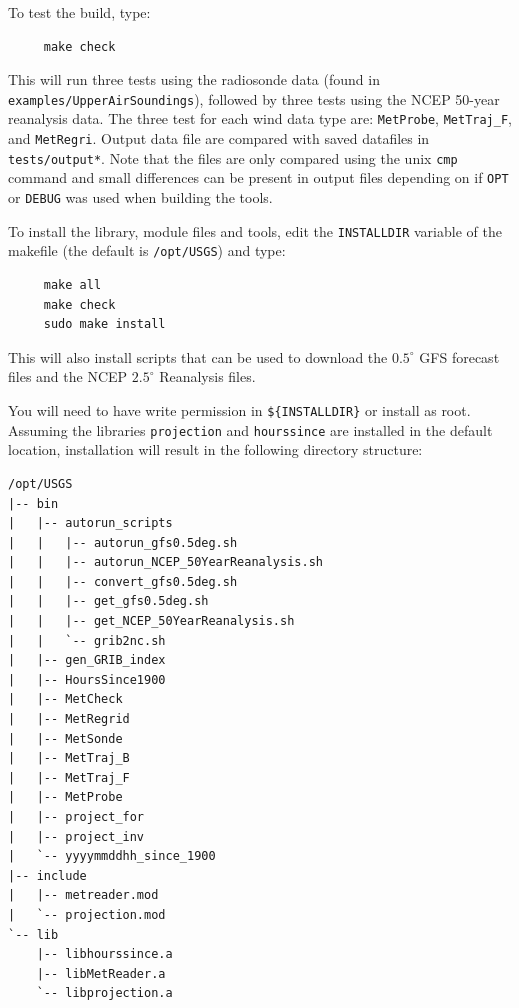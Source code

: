 \documentclass[11pt]{article}   %
\begin{document}
To test the build, type:
\begin{verbatim}
     make check
\end{verbatim}
This will run three tests using the radiosonde data (found in \texttt{examples/UpperAirSoundings}),
followed by three tests using the NCEP 50-year reanalysis data.  The three test for
each wind data type are: \texttt{MetProbe}, \texttt{MetTraj\_F}, and \texttt{MetRegri}.
Output data file are compared with saved datafiles in \texttt{tests/output*}. Note that
the files are only compared using the unix \texttt{cmp} command and small differences
can be present in output files depending on if \texttt{OPT} or \texttt{DEBUG} was used
when building the tools.

To install the library, module files and tools, edit the \texttt{INSTALLDIR} variable of
the makefile (the default is \texttt{/opt/USGS}) and type:
\begin{verbatim}
     make all
     make check
     sudo make install
\end{verbatim}
This will also install scripts that can be used to download the $0.5^{\circ}$ GFS
forecast files and the NCEP $2.5^{\circ}$ Reanalysis files.

You will need to have write permission in \texttt{\$\{INSTALLDIR\}}
or install as root.  Assuming the libraries \texttt{projection} and \texttt{hourssince} are
installed in the default location, installation will result in the following
directory structure:
\begin{verbatim}
/opt/USGS
|-- bin
|   |-- autorun_scripts
|   |   |-- autorun_gfs0.5deg.sh
|   |   |-- autorun_NCEP_50YearReanalysis.sh
|   |   |-- convert_gfs0.5deg.sh
|   |   |-- get_gfs0.5deg.sh
|   |   |-- get_NCEP_50YearReanalysis.sh
|   |   `-- grib2nc.sh
|   |-- gen_GRIB_index
|   |-- HoursSince1900
|   |-- MetCheck
|   |-- MetRegrid
|   |-- MetSonde
|   |-- MetTraj_B
|   |-- MetTraj_F
|   |-- MetProbe
|   |-- project_for
|   |-- project_inv
|   `-- yyyymmddhh_since_1900
|-- include
|   |-- metreader.mod
|   `-- projection.mod
`-- lib
    |-- libhourssince.a
    |-- libMetReader.a
    `-- libprojection.a
\end{verbatim}
\end{document}
